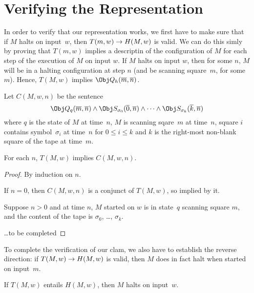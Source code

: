 \documentclass[open-logic-section]{subfiles}
\begin{document}
\section{Verifying the Representation}

\begin{wordy}
In order to verify that our representation works, we first have to
make sure that if $M$ halts on input~$w$, then $T(m, w) \to H(M, w)$
is valid.  We can do this simly by proving that $T(m, w)$ implies a
descriptin of the configuration of $M$ for each step of the execution
of $M$ on input $w$.  If $M$ halts on input $w$, then for some $n$,
$M$ will be in a halting configuration at step $n$ (and be scanning
square~$m$, for some $m$).  Hence, $T(M, w)$ implies $\Obj
Q_h(\overline m, \overline n)$.  
\end{wordy}

\begin{defn}
Let $C(M, w, n)$ be the sentence
\[
\Obj Q_q(\overline m, \overline n) \land \Obj S_{\sigma_0}(\overline
0, \overline n) \land \dots \land \Obj S_{\sigma_k}(\overline k,
\overline n)
\]
where $q$ is the state of $M$ at time~$n$, $M$ is scanning sqare~$m$
at time~$n$, square $i$ contains symbol~$\sigma_i$ at time~$n$ for $0
\le i \le k$ and $k$ is the right-most non-blank square of the tape at
time~$m$.
\end{defn}

\begin{lem}
For each $n$, $T(M, w)$ implies $C(M, w, n)$.
\end{lem}

\begin{proof}
By induction on $n$.

If $n = 0$, then $C(M, w, n)$ is a conjunct of $T(M, w)$, so implied by it.

Suppose $n > 0$ and at time $n$, $M$ started on $w$ is in state~$q$
scanning square $m$, and the content of the tape is $\sigma_0$, \dots,
$\sigma_k$.

\dots to be completed

\end{proof}

\begin{wordy}
To complete the verification of our clam, we also have to establish
the reverse direction: if $T(M, w) \to H(M, w)$ is valid, then $M$
does in fact halt when started on input~$m$.  
\end{wordy}

\begin{lem}
If $T(M, w)$ entails $H(M, w)$, then $M$ halts on input~$w$.
\end{lem}
\end{document}
